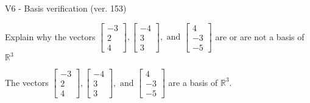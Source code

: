 \begin{exercise}
  \begin{exerciseTitle}V6 - Basis verification (ver. 153)\end{exerciseTitle}
  \begin{exerciseStatement}
    Explain why the vectors \(\left[\begin{array}{r}
-3 \\
2 \\
4
\end{array}\right] , \left[\begin{array}{r}
-4 \\
3 \\
3
\end{array}\right] , \text{ and } \left[\begin{array}{r}
4 \\
-3 \\
-5
\end{array}\right]\) are or are not a basis of \(\mathbb{R}^3\)	


  \end{exerciseStatement}
  \begin{exerciseAnswer}
   The vectors \(\left[\begin{array}{r}
-3 \\
2 \\
4
\end{array}\right] , \left[\begin{array}{r}
-4 \\
3 \\
3
\end{array}\right] , \text{ and } \left[\begin{array}{r}
4 \\
-3 \\
-5
\end{array}\right]\) 
  	 are  a basis of \(\mathbb{R}^3\).
  


  \end{exerciseAnswer}
\end{exercise}